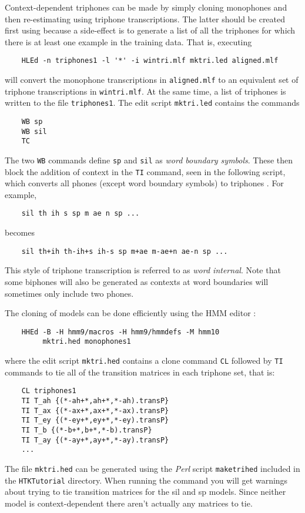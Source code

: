 Context-dependent triphones can be made by simply 
cloning monophones and then
re-estimating using triphone transcriptions.  The latter should be created
first using  because 
a side-effect is to generate a list of all
the triphones for which there is at least one example in the training data.
That is, executing
\begin{verbatim}
    HLEd -n triphones1 -l '*' -i wintri.mlf mktri.led aligned.mlf
\end{verbatim}
will convert the monophone transcriptions in \texttt{aligned.mlf} to
an equivalent set of triphone transcriptions in \texttt{wintri.mlf}.
At the same time, a list of triphones is written to the file \texttt{triphones1}.
The edit script \texttt{mktri.led}  contains the commands
\begin{verbatim}
    WB sp
    WB sil
    TC 
\end{verbatim}
The two \texttt{WB} commands define \texttt{sp} and \texttt{sil}
as \textit{word boundary symbols}.  These then block the addition of
context in the \texttt{TI} command, seen in the following script, which converts all phones
(except word boundary symbols) to triphones
.  
For example,
\begin{verbatim}
    sil th ih s sp m ae n sp ...
\end{verbatim}
becomes
\begin{verbatim}
    sil th+ih th-ih+s ih-s sp m+ae m-ae+n ae-n sp ...
\end{verbatim}
This style of triphone transcription is referred to as \textit{word internal}.
Note that some biphones will also be generated as contexts at word boundaries
will sometimes only include two phones.

The cloning of models can be done efficiently using the HMM editor :
\begin{verbatim}
    HHEd -B -H hmm9/macros -H hmm9/hmmdefs -M hmm10 
         mktri.hed monophones1
\end{verbatim}
where the edit script \texttt{mktri.hed}
contains a clone command \texttt{CL} followed by \texttt{TI} commands to tie all of
the transition matrices in each triphone set, that is:
\begin{verbatim}
    CL triphones1
    TI T_ah {(*-ah+*,ah+*,*-ah).transP}
    TI T_ax {(*-ax+*,ax+*,*-ax).transP}
    TI T_ey {(*-ey+*,ey+*,*-ey).transP}
    TI T_b {(*-b+*,b+*,*-b).transP}
    TI T_ay {(*-ay+*,ay+*,*-ay).transP}
    ...
\end{verbatim}  
The file \texttt{mktri.hed} can be generated using the {\em Perl} script
\texttt{maketrihed} included in the \texttt{HTKTutorial} directory.
When running the  command you
will get warnings about trying to tie transition matrices for the sil
and sp models. Since neither model is context-dependent there aren't
actually any matrices to tie.

